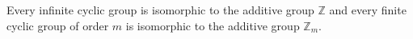 \begin{theorem}
Every infinite cyclic group is isomorphic to the additive group $\mathbb{Z}$ and every finite cyclic group of order $m$ is isomorphic to the additive group $\mathbb{Z}_m$.
\end{theorem}
